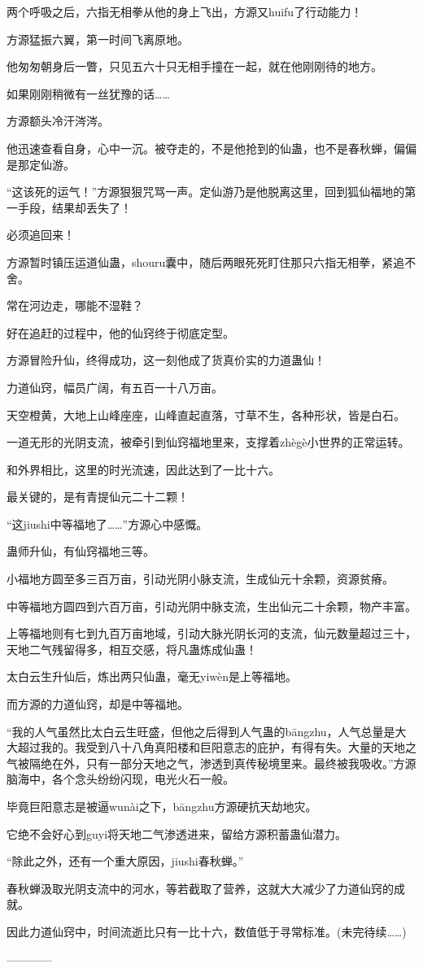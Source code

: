 \begin{this_body}
两个呼吸之后，六指无相拳从他的身上飞出，方源又huifu了行动能力！

方源猛振六翼，第一时间飞离原地。

他匆匆朝身后一瞥，只见五六十只无相手撞在一起，就在他刚刚待的地方。

如果刚刚稍微有一丝犹豫的话……

方源额头冷汗涔涔。

他迅速查看自身，心中一沉。被夺走的，不是他抢到的仙蛊，也不是春秋蝉，偏偏是那定仙游。

“这该死的运气！”方源狠狠咒骂一声。定仙游乃是他脱离这里，回到狐仙福地的第一手段，结果却丢失了！

必须追回来！

方源暂时镇压运道仙蛊，shouru囊中，随后两眼死死盯住那只六指无相拳，紧追不舍。

常在河边走，哪能不湿鞋？

好在追赶的过程中，他的仙窍终于彻底定型。

方源冒险升仙，终得成功，这一刻他成了货真价实的力道蛊仙！

力道仙窍，幅员广阔，有五百一十八万亩。

天空橙黄，大地上山峰座座，山峰直起直落，寸草不生，各种形状，皆是白石。

一道无形的光阴支流，被牵引到仙窍福地里来，支撑着zhègè小世界的正常运转。

和外界相比，这里的时光流速，因此达到了一比十六。

最关键的，是有青提仙元二十二颗！

“这jiushi中等福地了……”方源心中感慨。

蛊师升仙，有仙窍福地三等。

小福地方圆至多三百万亩，引动光阴小脉支流，生成仙元十余颗，资源贫瘠。

中等福地方圆四到六百万亩，引动光阴中脉支流，生出仙元二十余颗，物产丰富。

上等福地则有七到九百万亩地域，引动大脉光阴长河的支流，仙元数量超过三十，天地二气残留得多，相互交感，将凡蛊炼成仙蛊！

太白云生升仙后，炼出两只仙蛊，毫无yiwèn是上等福地。

而方源的力道仙窍，却是中等福地。

“我的人气虽然比太白云生旺盛，但他之后得到人气蛊的bāngzhu，人气总量是大大超过我的。我受到八十八角真阳楼和巨阳意志的庇护，有得有失。大量的天地之气被隔绝在外，只有一部分天地之气，渗透到真传秘境里来。最终被我吸收。”方源脑海中，各个念头纷纷闪现，电光火石一般。

毕竟巨阳意志是被逼wunài之下，bāngzhu方源硬抗天劫地灾。

它绝不会好心到guyi将天地二气渗透进来，留给方源积蓄蛊仙潜力。

“除此之外，还有一个重大原因，jiushi春秋蝉。”

春秋蝉汲取光阴支流中的河水，等若截取了营养，这就大大减少了力道仙窍的成就。

因此力道仙窍中，时间流逝比只有一比十六，数值低于寻常标准。(未完待续……)

------------

\end{this_body}

